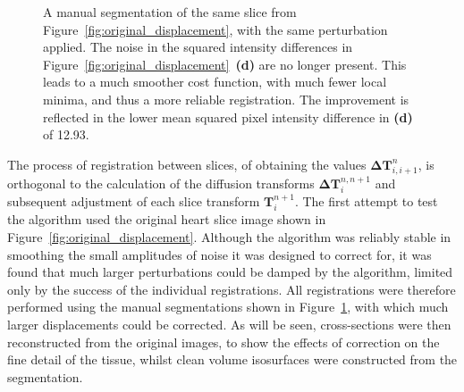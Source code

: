 \begin{figure}[htbp]
    \caption{A manual segmentation of the same slice from Figure~\ref{fig:original_displacement}, with the same perturbation applied. The noise in the squared intensity differences in Figure~\ref{fig:original_displacement}~\textbf{(d)} are no longer present. This leads to a much smoother cost function, with much fewer local minima, and thus a more reliable registration. The improvement is reflected in the lower mean squared pixel intensity difference in \textbf{(d)} of 12.93.}
    \label{fig:segmented_displacement}
  \end{figure}
  
  The process of registration between slices, of obtaining the values $\mathbf{\Delta T}_{i,i+1}^n$, is orthogonal to the calculation of the diffusion transforms $\mathbf{\Delta T}_i^{n,n+1}$ and subsequent adjustment of each slice transform $\mathbf{T}_i^{n+1}$. The first attempt to test the algorithm used the original heart slice image shown in Figure~\ref{fig:original_displacement}. Although the algorithm was reliably stable in smoothing the small amplitudes of noise it was designed to correct for, it was found that much larger perturbations could be damped by the algorithm, limited only by the success of the individual registrations. All registrations were therefore performed using the manual segmentations shown in Figure~\ref{fig:segmented_displacement}, with which much larger displacements could be corrected. As will be seen, cross-sections were then reconstructed from the original images, to show the effects of correction on the fine detail of the tissue, whilst clean volume isosurfaces were constructed from the segmentation.
  
